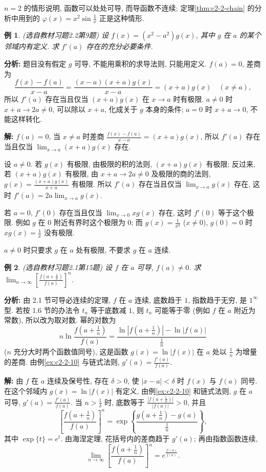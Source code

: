 \documentclass[UTF8,openany]{ctexbook}
\theoremstyle{chinesetextbook}
\newtheorem{example}{例}[section]
\newenvironment{cnsolution}{\par\indent\textbf{解:} \ignorespaces}{\par}
\begin{document}
$n=2$ 的情形说明, 函数可以处处可导, 而导函数不连续; 定理\ref{thm:c2-2-chain} 的分析中用到的 $\displaystyle\varphi(x)=x^2\sin\frac1x$ 正是这种情形.
\begin{example}\label{ex:c2-h2-9}
\textnormal{(选自教材习题2.2第9题)} 设 $f(x)=(x^2-a^2)g(x)$, 其中 $g$ 在 $a$ 的某个邻域内有定义. 求 $f'(a)$ 存在的充分必要条件.
\end{example}
\par\indent\textbf{分析:} 题目没有假定 $g$ 可导, 不能用乘积的求导法则, 只能用定义. $f(a)=0$, 差商为
\[
\frac{f(x)-f(a)}{x-a}=\frac{(x-a)(x+a)g(x)}{x-a}=(x+a)g(x)\quad(x\ne a),
\]
所以 $f'(a)$ 存在当且仅当 $(x+a)g(x)$ 在 $x\to a$ 时有极限. $a\ne0$ 时 $x+a\to2a\ne0$, 可以除以 $x+a$, 化成关于 $g$ 本身的条件; $a=0$ 时 $x+a\to0$, 不能这样转化.
\begin{cnsolution}
$f(a)=0$, 当 $x\ne a$ 时差商 $\displaystyle\frac{f(x)-f(a)}{x-a}=(x+a)g(x)$, 所以 $f'(a)$ 存在当且仅当 $\displaystyle\lim_{x\to a}(x+a)g(x)$ 存在.

设 $a\ne0$. 若 $g(x)$ 有极限, 由极限的积的法则, $(x+a)g(x)$ 有极限; 反过来, 若 $(x+a)g(x)$ 有极限, 由 $x+a\to2a\ne0$ 及极限的商的法则, $\displaystyle g(x)=\frac{(x+a)g(x)}{x+a}$ 有极限. 所以 $f'(a)$ 存在当且仅当 $\displaystyle\lim_{x\to a}g(x)$ 存在, 这时 $\displaystyle f'(a)=2a\lim_{x\to a}g(x)$.

若 $a=0$, $f'(0)$ 存在当且仅当 $\displaystyle\lim_{x\to0}xg(x)$ 存在, 这时 $f'(0)$ 等于这个极限. 例如 $g$ 在 $0$ 附近有界时这个极限为 $0$; 而 $\displaystyle g(x)=\frac1{x^2}$ ($x\ne0$), $g(0)=0$ 时 $\displaystyle xg(x)=\frac1x$ 没有极限.
\end{cnsolution}
$a\ne0$ 时只要求 $g$ 在 $a$ 处有极限, 不要求 $g$ 在 $a$ 连续.
\begin{example}\label{ex:c2-h1-15}
\textnormal{(选自教材习题2.1第15题)} 设 $f$ 在 $a$ 可导, $f(a)\ne0$. 求 $\displaystyle\lim_{n\to\infty}\left[\frac{f\left(a+\frac1n\right)}{f(a)}\right]^n$.
\end{example}
\par\indent\textbf{分析:} 由 2.1 节可导必连续的定理, $f$ 在 $a$ 连续, 底数趋于 $1$, 指数趋于无穷, 是 $1^\infty$ 型. 若按 1.6 节的办法令 $t_n$ 等于底数减 $1$, 则 $t_n$ 可能等于零 (例如 $f$ 在 $a$ 附近为常数), 所以改为取对数. 幂的对数为
\[
n\ln\frac{f\left(a+\frac1n\right)}{f(a)}=\frac{\ln\left|f\left(a+\frac1n\right)\right|-\ln|f(a)|}{\frac1n}
\]
($n$ 充分大时两个函数值同号), 这是函数 $g(x)=\ln|f(x)|$ 在 $a$ 处以 $\displaystyle\frac1n$ 为增量的差商. 由例\ref{ex:c2-2-10} 与链式法则, $\displaystyle g'(a)=\frac{f'(a)}{f(a)}$.
\begin{cnsolution}
由 $f$ 在 $a$ 连续及保号性, 存在 $\delta>0$, 使 $|x-a|<\delta$ 时 $f(x)$ 与 $f(a)$ 同号. 在这个邻域内 $g(x)=\ln|f(x)|$ 有定义, 由例\ref{ex:c2-2-10} 和链式法则, $g$ 在 $a$ 可导, $\displaystyle g'(a)=\frac{f'(a)}{f(a)}$. 当 $\displaystyle n>\frac1\delta$ 时, 底数等于 $\displaystyle\frac{\left|f\left(a+\frac1n\right)\right|}{|f(a)|}>0$, 并且
\[
\left[\frac{f\left(a+\frac1n\right)}{f(a)}\right]^n=\exp\left\{\frac{g\left(a+\frac1n\right)-g(a)}{\frac1n}\right\},
\]
其中 $\exp\{t\}=e^t$. 由海涅定理, 花括号内的差商趋于 $g'(a)$; 再由指数函数连续,
\[
\lim_{n\to\infty}\left[\frac{f\left(a+\frac1n\right)}{f(a)}\right]^n=e^{\frac{f'(a)}{f(a)}}.
\]
\end{cnsolution}
\end{document}
